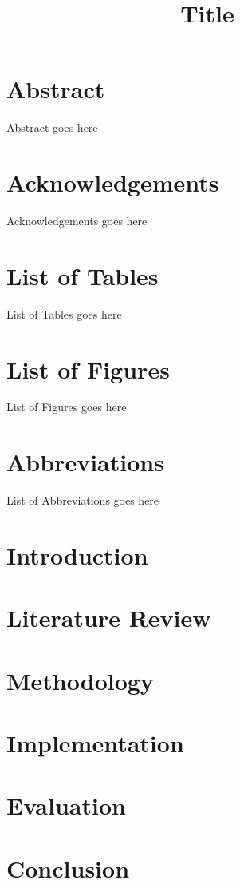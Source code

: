 \documentclass[oneside]{book}
\begin{document}
\frontmatter

\title{Title}
\maketitle

\chapter{Abstract}
Abstract goes here

\chapter{Acknowledgements}
Acknowledgements goes here

\tableofcontents

\chapter{List of Tables}
List of Tables goes here

\chapter{List of Figures}
List of Figures goes here

\chapter{Abbreviations}
List of Abbreviations goes here

\mainmatter

\chapter{Introduction}


\chapter{Literature Review}


\chapter{Methodology}


\chapter{Implementation}


\chapter{Evaluation}


\chapter{Conclusion}


\newpage


\end{document}
